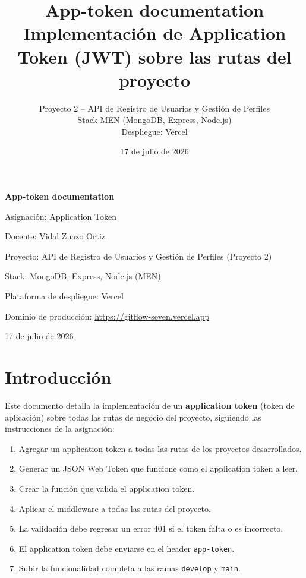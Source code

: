\documentclass[11pt,letterpaper]{article}
\title{\textbf{App-token documentation}\\[0.3cm]\large Implementación de Application Token (JWT) sobre las rutas del proyecto}
\author{Proyecto 2 -- API de Registro de Usuarios y Gestión de Perfiles \\ Stack MEN (MongoDB, Express, Node.js) \\ Despliegue: Vercel}
\date{17 de julio de 2026}
\begin{document}
\begin{titlepage}
\centering
\vspace*{2cm}
{\Huge\bfseries App-token documentation\par}
\vspace{1cm}
{\Large Asignación: Application Token\par}
\vspace{0.5cm}
{\large Docente: Vidal Zuazo Ortiz\par}
\vspace{2cm}
{\large Proyecto: API de Registro de Usuarios y Gestión de Perfiles (Proyecto 2)\par}
{\large Stack: MongoDB, Express, Node.js (MEN)\par}
{\large Plataforma de despliegue: Vercel\par}
\vspace{2cm}
{\large Dominio de producción: \url{https://gitflow-seven.vercel.app}\par}
\vspace{2cm}
{\large 17 de julio de 2026\par}
\vfill
\end{titlepage}

\tableofcontents
\newpage

\section{Introducción}

Este documento detalla la implementación de un \textbf{application token} (token de aplicación) sobre
todas las rutas de negocio del proyecto, siguiendo las instrucciones de la asignación:

\begin{enumerate}[label=\arabic*.]
  \item Agregar un application token a todas las rutas de los proyectos desarrollados.
  \item Generar un JSON Web Token que funcione como el application token a leer.
  \item Crear la función que valida el application token.
  \item Aplicar el middleware a todas las rutas del proyecto.
  \item La validación debe regresar un error 401 si el token falta o es incorrecto.
  \item El application token debe enviarse en el header \texttt{app-token}.
  \item Subir la funcionalidad completa a las ramas \texttt{develop} y \texttt{main}.
\end{enumerate}
\end{document}
